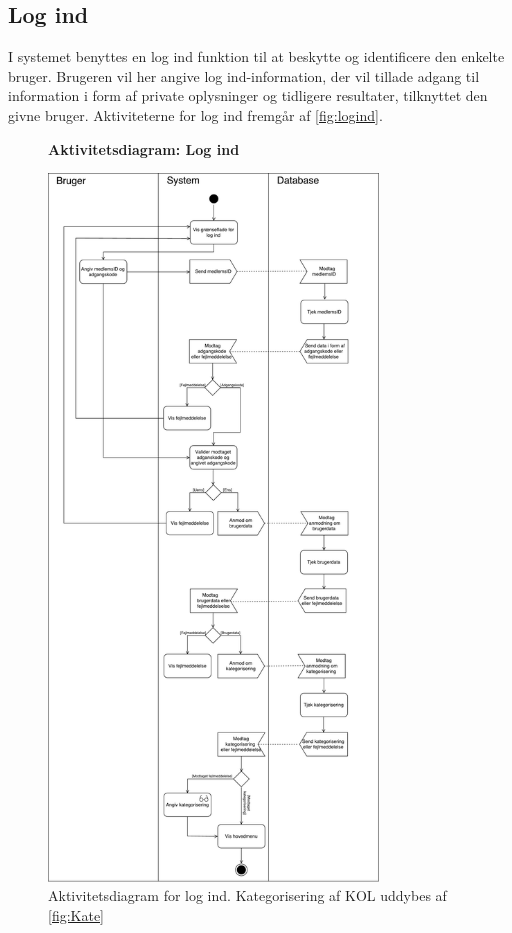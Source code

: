 \subsection*{Log ind}
I systemet benyttes en log ind funktion til at beskytte og identificere den enkelte bruger. Brugeren vil her angive log ind-information, der vil tillade adgang til information i form af private oplysninger og tidligere resultater, tilknyttet den givne bruger. Aktiviteterne for log ind fremgår af \autoref{fig:logind}.    


\begin{figure} [H]
\centering
\textbf{Aktivitetsdiagram: Log ind}\par\medskip
\includegraphics[width=0.78\textwidth]{figures/aktivitetsdiagram/Logind}
\caption{Aktivitetsdiagram for log ind. Kategorisering af KOL uddybes af \autoref{fig:Kate}}
\label{fig:logind}
\end{figure}



